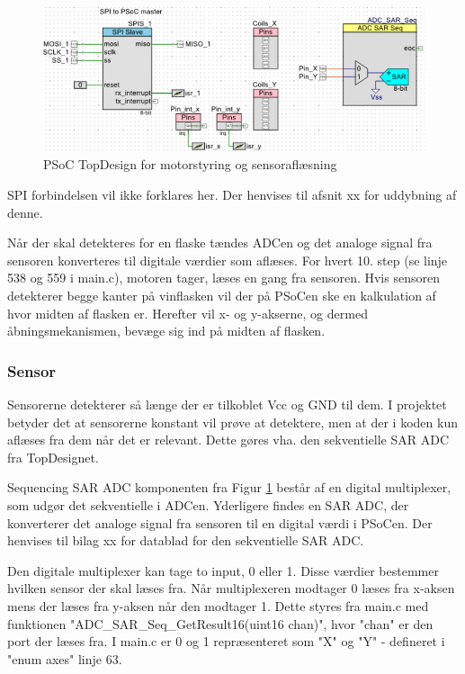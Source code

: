 \begin{figure}[H]
\includegraphics[scale=0.48]{PSoC_TopDesign_X_Y.png}
\caption{PSoC TopDesign for motorstyring og sensoraflæsning}
\label{PSoC_TopDesign_X_Y}
\end{figure}

SPI forbindelsen vil ikke forklares her. Der henvises til afsnit xx for uddybning af denne.

Når der skal detekteres for en flaske tændes ADCen og det analoge signal fra sensoren konverteres til digitale værdier som aflæses. For hvert 10. step (se linje 538 og 559 i main.c), motoren tager, læses en gang fra sensoren. Hvis sensoren detekterer begge kanter på vinflasken vil der på PSoCen ske en kalkulation af hvor midten af flasken er. Herefter vil x- og y-akserne, og dermed åbningsmekanismen, bevæge sig ind på midten af flasken.

\subsubsection{Sensor}
Sensorerne detekterer så længe der er tilkoblet Vcc og GND til dem. I projektet betyder det at sensorerne konstant vil prøve at detektere, men at der i koden kun aflæses fra dem når det er relevant. Dette gøres vha. den sekventielle SAR ADC fra TopDesignet.

Sequencing SAR ADC komponenten fra Figur \ref{PSoC_TopDesign_X_Y} består af en digital multiplexer, som udgør det sekventielle i ADCen. Yderligere findes en SAR ADC, der konverterer det analoge signal fra sensoren til en digital værdi i PSoCen. Der henvises til bilag xx for datablad for den sekventielle SAR ADC.

Den digitale multiplexer kan tage to input, 0 eller 1. Disse værdier bestemmer hvilken sensor der skal læses fra. Når multiplexeren modtager 0 læses fra x-aksen mens der læses fra y-aksen når den modtager 1. Dette styres fra main.c med funktionen "ADC_SAR_Seq_GetResult16(uint16 chan)", hvor "chan" er den port der læses fra. I main.c er 0 og 1 repræsenteret som "X" og "Y" - defineret i "enum axes" linje 63.

